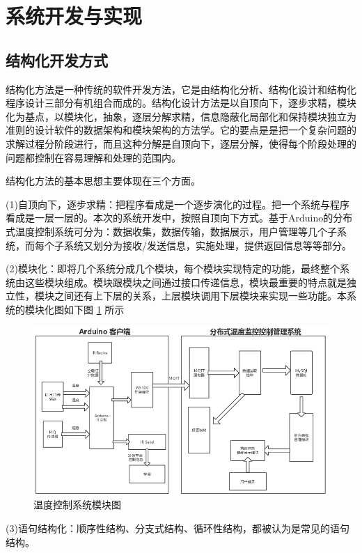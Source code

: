 \section{系统开发与实现}

\subsection{结构化开发方式}

结构化方法是一种传统的软件开发方法，它是由结构化分析、结构化设计和结构化程序设计三部分有机组合而成的。结构化设计方法是以自顶向下，逐步求精，模块化为基点，以模块化，抽象，逐层分解求精，信息隐蔽化局部化和保持模块独立为准则的设计软件的数据架构和模块架构的方法学。它的要点是是把一个复杂问题的求解过程分阶段进行，而且这种分解是自顶向下，逐层分解，使得每个阶段处理的问题都控制在容易理解和处理的范围内。

结构化方法的基本思想主要体现在三个方面。

(1)自顶向下，逐步求精：把程序看成是一个逐步演化的过程。把一个系统与程序看成是一层一层的。本次的系统开发中，按照自顶向下方式。基于Arduino的分布式温度控制系统可分为：数据收集，数据传输，数据展示，用户管理等几个子系统，而每个子系统又划分为接收/发送信息，实施处理，提供返回信息等等部分。

(2)模块化：即将几个系统分成几个模块，每个模块实现特定的功能，最终整个系统由这些模块组成。模块跟模块之间通过接口传递信息，模块最重要的特点就是独立性，模块之间还有上下层的关系，上层模块调用下层模块来实现一些功能。本系统的模块化图如下图 \ref{fig:4-1} 所示

\begin{figure}[htbp]
	\centering
	\includegraphics[width=\linewidth]{figure/4-1}
	\caption{温度控制系统模块图}
	\label{fig:4-1}
\end{figure}

(3)语句结构化：顺序性结构、分支式结构、循环性结构，都被认为是常见的语句结构。

